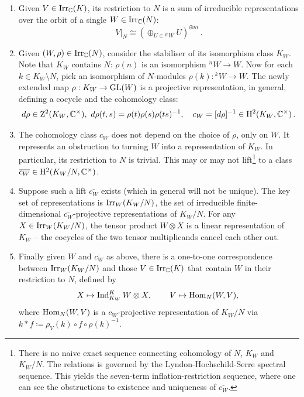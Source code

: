   \begin{enumerate}[label=\textnormal{(\Roman*)}]
  \item Given $V\in {\operatorname{Irr}_{{\mathbb C}}(K)}$, its restriction to $N$ is a sum of irreducible representations over the orbit of a single $W\in {\operatorname{Irr}_{{\mathbb C}}(N)}$:
\begin{equation} \label{Cliff_1b}
  V|_N \cong \left(\oplus_{U \in {}^{K}W} U\right)^{\oplus m}\, . 
\end{equation} 
\item Given $(W,\rho) \in {\operatorname{Irr}_{{\mathbb C}}(N)}$, consider the stabiliser of its isomorphism class $K_W$. Note that $K_W$ contains $N$:
$\rho(n)$ is an isomorphism ${}^n W \to W$. Now for each $k\in K_W \setminus N$, pick an isomorphism of $N$-modules $\rho(k) : {}^k W \to W$.
The newly extended map $\rho : K_W \to \operatorname{GL} (W)$ is a projective representation, in general, defining
a cocycle and the cohomology class:
\begin{equation} \label{Cliff_1c}
d\rho \in \mathrm{Z}^2 (K_W , {\mathbb C}^\times), \ d \rho (t,s) = \rho (t) \rho (s) \rho (ts)^{-1}, \quad
c_W = [ d \rho]^{-1} \in \mathrm{H}^2 (K_W , {\mathbb C}^\times) \, .
\end{equation}  
\item The cohomology class $c_W$ does not depend on the choice of $\rho$, only on $W$.
It represents an obstruction to turning $W$ into a representation of $K_W$.  
In particular, its restriction to $N$ is trivial.
This may or may not lift\footnote{There is no naive exact sequence connecting cohomology of $N$, $K_W$ and $K_W/N$. The relations is governed by the Lyndon-Hochschild-Serre spectral sequence. This yields the seven-term inflation-restriction sequence, where one can see the obstructions to existence and uniqueness of $\overline{c_W}$.}
to a class $\overline{c_W} \in  \mathrm{H}^2 (K_W/N , {\mathbb C}^\times)$.
\item Suppose such a lift $\overline{c_W}$ exists (which in general will not be unique).
  The key set of representations is ${\operatorname{Irr}_{W}(K_W/N)}$, the set of irreducible finite-dimensional $\overline{c_W}$-projective representations of $K_W/N$. For any $X\in {\operatorname{Irr}_{W}(K_W/N)}$, the tensor product $W\otimes X$
  is a linear representation of $K_W$ -- the cocycles of the two tensor multiplicands cancel each other out.
\item Finally given $W$ and $\overline{c_W}$ as above, there is a one-to-one correspondence between
  ${\operatorname{Irr}_{W}(K_W/N)}$ and those $V\in {\operatorname{Irr}_{{\mathbb C}}(K)}$ that contain $W$ in their restriction to $N$, defined by
\begin{equation} \label{Cliff_1d}
  X \mapsto \operatorname{Ind}_{K_W}^K W \otimes X, \, \qquad V \mapsto \operatorname{Hom}_N(W,V), \,
\end{equation}  
where $\operatorname{Hom}_N(W,V)$ is a $c_W$-projective representation of $K_W/N$ via $k * f \coloneqq \rho_V(k) \circ f \circ \rho(k)^{-1}$.
\end{enumerate}

